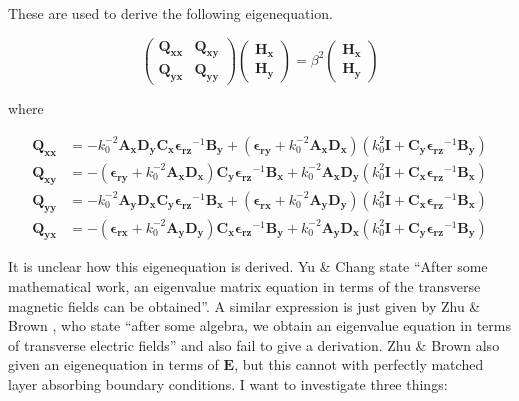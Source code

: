 \documentclass[]{article}
\begin{document}
These are used to derive the following eigenequation.

\begin{equation}
\begin{pmatrix}
\mathbf{Q_{xx}} & \mathbf{Q_{xy}} \\
\mathbf{Q_{yx}} & \mathbf{Q_{yy}}
\end{pmatrix}
\begin{pmatrix}
\mathbf{H_x} \\
\mathbf{H_y}
\end{pmatrix}
=
\beta^2
\begin{pmatrix}
\mathbf{H_x} \\
\mathbf{H_y}
\end{pmatrix}
\label{eq:YuChangEigenEquation}
\end{equation}

where 

\begin{align*}
\mathbf{Q_{xx}} &= -k_0^{-2} \mathbf{A_x} \mathbf{D_y} \mathbf{C_x} \mathbf{\epsilon_{rz}}^{-1} \mathbf{B_y} + (\mathbf{\epsilon_{ry}} + k_0^{-2} \mathbf{A_x} \mathbf{D_x}) (k_0^2 \mathbf{I} + \mathbf{C_y} \mathbf{\epsilon_{rz}}^{-1} \mathbf{B_y}) \\
\mathbf{Q_{xy}} &= -(\mathbf{\epsilon_{ry}} + k_0^{-2} \mathbf{A_x}\mathbf{D_x}) \mathbf{C_y} \mathbf{\epsilon_{rz}}^{-1} \mathbf{B_x} + k_0^{-2} \mathbf{A_x} \mathbf{D_y} (k_0^2 \mathbf{I} + \mathbf{C_x} \mathbf{\epsilon_{rz}}^{-1} \mathbf{B_x}) \\
\mathbf{Q_{yy}} &= -k_0^{-2} \mathbf{A_y} \mathbf{D_x} \mathbf{C_y} \mathbf{\epsilon_{rz}}^{-1} \mathbf{B_x} + (\mathbf{\epsilon_{rx}} + k_0^{-2} \mathbf{A_y} \mathbf{D_y}) (k_0^2 \mathbf{I} + \mathbf{C_x} \mathbf{\epsilon_{rz}}^{-1} \mathbf{B_x}) \\
\mathbf{Q_{yx}} &= -(\mathbf{\epsilon_{rx}} + k_0^{-2} \mathbf{A_y}\mathbf{D_y}) \mathbf{C_x} \mathbf{\epsilon_{rz}}^{-1} \mathbf{B_y} + k_0^{-2} \mathbf{A_y} \mathbf{D_x} (k_0^2 \mathbf{I} + \mathbf{C_y} \mathbf{\epsilon_{rz}}^{-1} \mathbf{B_y})
\end{align*}

It is unclear how this eigenequation is derived. Yu \& Chang state ``After some mathematical work, an eigenvalue matrix equation in terms of the transverse magnetic fields can be obtained''. A similar expression is just given by Zhu \& Brown \cite{Zhu2002}, who state ``after some algebra, we obtain an eigenvalue equation in terms of transverse electric fields'' and also fail to give a derivation. Zhu \& Brown also given an eigenequation in terms of $\mathbf{E}$, but this cannot with perfectly matched layer absorbing boundary conditions. I want to investigate three things:
\end{document}
